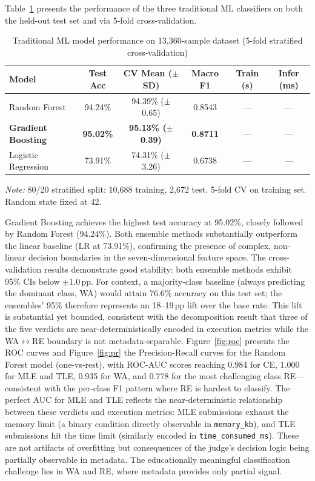 \documentclass[acmsmall]{acmart}
\begin{document}
Table~\ref{tab:ml-results} presents the performance of the three traditional
ML classifiers on both the held-out test set and via 5-fold cross-validation.

\begin{table}[htbp]
\centering
\caption{Traditional ML model performance on 13,360-sample dataset
         (5-fold stratified cross-validation)}
\label{tab:ml-results}
\begin{tabular}{@{}lccccc@{}}
\toprule
Model & Test Acc & CV Mean ($\pm$SD) & Macro F1 & Train (s) & Infer (ms) \\
\midrule
Random Forest       & 94.24\% & 94.39\% ($\pm$0.65) & 0.8543 & --- & --- \\
\textbf{Gradient Boosting}   & \textbf{95.02\%} & \textbf{95.13\% ($\pm$0.39)} & \textbf{0.8711} & --- & --- \\
Logistic Regression & 73.91\% & 74.31\% ($\pm$3.26) & 0.6738 & --- & --- \\
\bottomrule
\end{tabular}

\vspace{2mm}
{\small \textit{Note:} 80/20 stratified split: 10,688 training, 2,672 test.
5-fold CV on training set. Random state fixed at 42.}
\end{table}

Gradient Boosting achieves the highest test accuracy at 95.02\%, closely
followed by Random Forest (94.24\%). Both ensemble methods substantially
outperform the linear baseline (LR at 73.91\%), confirming the presence of
complex, non-linear decision boundaries in the seven-dimensional feature
space. The cross-validation results demonstrate good stability: both ensemble
methods exhibit 95\% CIs below $\pm$1.0\,pp. For context, a
majority-class baseline (always predicting the dominant class, WA) would
attain 76.6\% accuracy on this test set; the ensembles' 95\% therefore
represents an 18--19\,pp lift over the base rate. This lift is substantial
yet bounded, consistent with the decomposition result that three of the five
verdicts are near-deterministically encoded in execution metrics while the
WA$\leftrightarrow$RE boundary is not metadata-separable.
Figure~\ref{fig:roc} presents the ROC curves and Figure~\ref{fig:pr} the
Precision-Recall curves for the Random Forest model (one-vs-rest), with
ROC-AUC scores reaching 0.984 for CE, 1.000 for MLE and TLE, 0.935 for WA,
and 0.778 for the most challenging class RE---consistent with the per-class F1
pattern where RE is hardest to classify. The perfect AUC for MLE and TLE reflects
the near-deterministic relationship between these verdicts and execution metrics:
MLE submissions exhaust the memory limit (a binary condition directly observable
in \texttt{memory\_kb}), and TLE submissions hit the time limit (similarly encoded
in \texttt{time\_consumed\_ms}). These are not artifacts of overfitting but
consequences of the judge's decision logic being partially observable in metadata.
The educationally meaningful classification challenge lies in WA and RE, where
metadata provides only partial signal.
\end{document}
